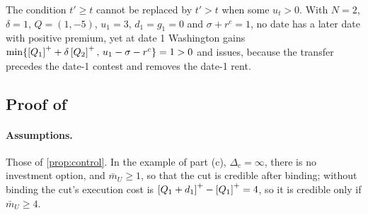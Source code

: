 The condition $t'\ge t$ cannot be replaced by $t'>t$ when some $u_t>0$. With $N=2$, $\delta=1$, $Q=(1,-5)$, $u_1=3$, $d_1=g_1=0$ and $\sigma+r^c=1$, no date has a later date with positive premium, yet at date 1 Washington gains $\min\{\left[Q_1\right]^{+}+\delta\left[Q_2\right]^{+},\,u_1-\sigma-r^c\}=1>0$ and issues, because the transfer precedes the date-1 contest and removes the date-1 rent.

\subsection{Proof of \texorpdfstring{}{self-binding and dual key}}

\paragraph{Assumptions.} Those of \cref{prop:control}. In the example of part (c), $\Delta_c=\infty$, there is no investment option, and $\bar m_U\ge 1$, so that the cut is credible after binding; without binding the cut's execution cost is $\left[Q_1+d_1\right]^{+}-\left[Q_1\right]^{+}=4$, so it is credible only if $\bar m_U\ge 4$.

